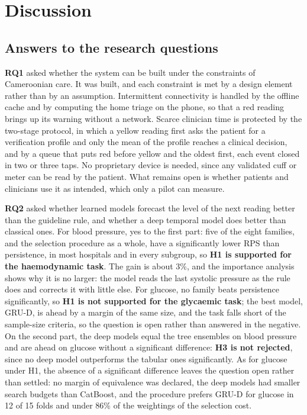 \documentclass[11pt,a4paper,oneside]{report}
\begin{document}
\section{Discussion}\label{sec:discussion}

\subsection{Answers to the research questions}

\textbf{RQ1} asked whether the system can be built under the constraints of Cameroonian care. It was built, and each constraint is met by a design element rather than by an assumption. Intermittent connectivity is handled by the offline cache and by computing the home triage on the phone, so that a red reading brings up its warning without a network. Scarce clinician time is protected by the two-stage protocol, in which a yellow reading first asks the patient for a verification profile and only the mean of the profile reaches a clinical decision, and by a queue that puts red before yellow and the oldest first, each event closed in two or three taps. No proprietary device is needed, since any validated cuff or meter can be read by the patient. What remains open is whether patients and clinicians use it as intended, which only a pilot can measure.

\textbf{RQ2} asked whether learned models forecast the level of the next reading better than the guideline rule, and whether a deep temporal model does better than classical ones. For blood pressure, yes to the first part: five of the eight families, and the selection procedure as a whole, have a significantly lower RPS than persistence, in most hospitals and in every subgroup, so \textbf{H1 is supported for the haemodynamic task}. The gain is about 3\%, and the importance analysis shows why it is no larger: the model reads the last systolic pressure as the rule does and corrects it with little else. For glucose, no family beats persistence significantly, so \textbf{H1 is not supported for the glycaemic task}; the best model, GRU-D, is ahead by a margin of the same size, and the task falls short of the sample-size criteria, so the question is open rather than answered in the negative. On the second part, the deep models equal the tree ensembles on blood pressure and are ahead on glucose without a significant difference: \textbf{H3 is not rejected}, since no deep model outperforms the tabular ones significantly. As for glucose under H1, the absence of a significant difference leaves the question open rather than settled: no margin of equivalence was declared, the deep models had smaller search budgets than CatBoost, and the procedure prefers GRU-D for glucose in 12 of 15 folds and under 86\% of the weightings of the selection cost.
\end{document}
